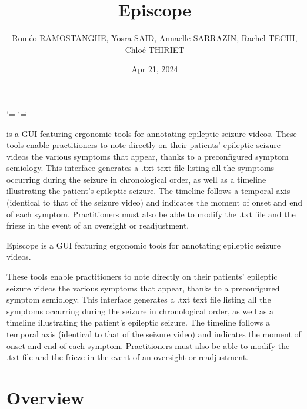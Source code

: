 \documentclass[letterpaper,10pt,english]{sphinxmanual}
\title{Episcope}
\date{Apr 21, 2024}
\author{Roméo RAMOS\sphinxhyphen{}\sphinxhyphen{}TANGHE, Yosra SAID, Annaelle SARRAZIN, Rachel TECHI, Chloé THIRIET}
\let\sphinxpxdimen\pdfpxdimen\else\newdimen\sphinxpxdimen
\begin{document}
\ifdefined\shorthandoff
  \ifnum\catcode`\=\string=\active\shorthandoff{=}\fi
  \ifnum\catcode`\"=\active{}\fi
\fi

\pagestyle{empty}
\sphinxmaketitle
\pagestyle{plain}
\sphinxtableofcontents
\pagestyle{normal}
\label{\detokenize{index::doc}}
\noindent{\hspace*{\fill}\sphinxincludegraphics[width=500\sphinxpxdimen,height=110\sphinxpxdimen]{{Logo_final}.png}\hspace*{\fill}}

\sphinxAtStartPar
{} is a GUI featuring ergonomic tools for annotating epileptic seizure videos.
These tools enable practitioners to note directly on their patients’ epileptic seizure videos the various symptoms that appear, thanks to a pre\sphinxhyphen{}configured symptom semiology. This interface generates a .txt text file listing all the symptoms occurring during the seizure in chronological order, as well as a timeline illustrating the patient’s epileptic seizure. The timeline follows a temporal axis (identical to that of the seizure video) and indicates the moment of onset and end of each symptom. Practitioners must also be able to modify the .txt file and the frieze in the event of an oversight or readjustment.

\sphinxstepscope



\sphinxAtStartPar
Episcope is a GUI featuring ergonomic tools for annotating epileptic seizure videos.

\sphinxAtStartPar
These tools enable practitioners to note directly on their patients’ epileptic seizure videos the various symptoms that appear, thanks to a pre\sphinxhyphen{}configured symptom semiology.
This interface generates a .txt text file listing all the symptoms occurring during the seizure in chronological order, as well as a timeline illustrating the patient’s
epileptic seizure. The timeline follows a temporal axis (identical to that of the seizure video) and indicates the moment of onset and end of each symptom. Practitioners must
also be able to modify the .txt file and the frieze in the event of an oversight or readjustment.


\chapter{Overview}
\label{\detokenize{GUI:overview}}
\noindent{\hspace*{\fill}\sphinxincludegraphics[width=1920\sphinxpxdimen,height=1030\sphinxpxdimen]{{interface_vide}.png}\hspace*{\fill}}
\end{document}
